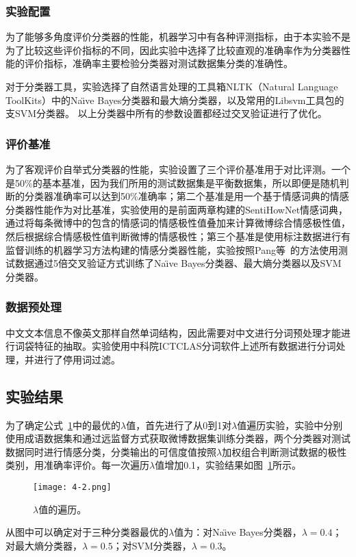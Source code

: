 \subsubsection{实验配置}
为了能够多角度评价分类器的性能，机器学习中有各种评测指标，由于本实验不是为了比较这些评价指标的不同，因此实验中选择了比较直观的准确率作为分类器性能的评价指标，准确率主要检验分类器对测试数据集分类的准确性。

对于分类器工具，实验选择了自然语言处理的工具箱NLTK（Natural Language ToolKits）中的Na\"\i ve Bayes分类器和最大熵分类器，以及常用的Libsvm工具包的支SVM分类器。
以上分类器中所有的参数设置都经过交叉验证进行了优化。

\subsubsection{评价基准}
为了客观评价自举式分类器的性能，实验设置了三个评价基准用于对比评测。一个是50\%的基本基准，因为我们所用的测试数据集是平衡数据集，所以即便是随机判断的分类器准确率可以达到50\%准确率；第二个基准是用一个基于情感词典的情感分类器性能作为对比基准，实验使用的是前面两章构建的SentiHowNet情感词典，通过将每条微博中的包含的情感词的情感极性值叠加来计算微博综合情感极性值，然后根据综合情感极性值判断微博的情感极性；第三个基准是使用标注数据进行有监督训练的机器学习方法构建的情感分类器性能，实验按照Pang等~的方法使用测试数据通过5倍交叉验证方式训练了Na\"\i ve Bayes分类器、最大熵分类器以及SVM分类器。

\subsubsection{数据预处理}
中文文本信息不像英文那样自然单词结构，因此需要对中文进行分词预处理才能进行词袋特征的抽取。实验使用中科院ICTCLAS分词软件上述所有数据进行分词处理，并进行了停用词过滤。

\subsection{实验结果}
\label{result}

为了确定公式~\ref{fig4-2}中的最优的$ \lambda $值，首先进行了从0到1对$ \lambda $值遍历实验，实验中分别使用成语数据集和通过远监督方式获取微博数据集训练分类器，两个分类器对测试数据同时进行情感分类，分类输出的可信度值按照$\lambda $加权组合判断测试数据的极性类别，用准确率评价。每一次遍历$ \lambda $值增加0.1，实验结果如图~\ref{fig4-2}所示。

\begin{figure}[htp]
\centering
\texttt{[image: 4-2.png]}
\caption{$ \lambda $值的遍历。}
\label{fig4-2}
\end{figure}
从图中可以确定对于三种分类器最优的$ \lambda $值为：对Na\"\i ve Bayes分类器，$ \lambda=0.4 $；对最大熵分类器，$ \lambda=0.5 $；对SVM分类器，$ \lambda=0.3 $。

